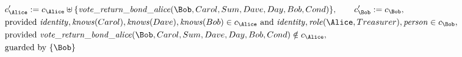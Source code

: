 \begin{align*}
&
c'_
{
\Alice
}
 := 
c_
{
\Alice
}
 \uplus 
\{
\mathit{\detokenize{
vote_return_bond_alice
}}
(
\Bob
,
Carol
,
Sum
,
Dave
,
Day
,
Bob
,
Cond
)
\}
, \qquad 
c'_
{
\Bob
}
 := 
c_
{
\Bob
}
,\\
&
\text{provided } 
\mathit{\detokenize{
identity
}}
,
\mathit{\detokenize{
knows
}}
(
Carol
)
,
\mathit{\detokenize{
knows
}}
(
Dave
)
,
\mathit{\detokenize{
knows
}}
(
Bob
)
 \in c_
{
\Alice
}
 \text{ and } 
\mathit{\detokenize{
identity
}}
,
\mathit{\detokenize{
role
}}
(
\Alice
,
Treasurer
)
,
\mathit{\detokenize{
person
}}
 \in c_
{
\Bob
}
,\\
&
\text{provided } 
\mathit{\detokenize{
vote_return_bond_alice
}}
(
\Bob
,
Carol
,
Sum
,
Dave
,
Day
,
Bob
,
Cond
)
 \notin c_
{
\Alice
}
,\\
&
\text{guarded by } \{
\Bob
\}
\end{align*}

